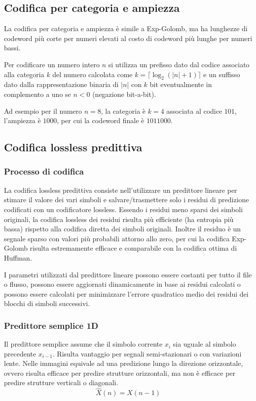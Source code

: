 \subsection{Codifica per categoria e ampiezza}
La codifica per categoria e ampiezza è simile a Exp-Golomb, ma ha lunghezze di codeword più corte per numeri elevati al
costo di codeword più lunghe per numeri bassi.

Per codificare un numero intero \(n\) si utilizza un prefisso dato dal codice associato alla categoria \(k\) del numero
calcolata come \(k = \lceil \log_2 (|n|+1) \rceil\) e un suffisso dato dalla rappresentazione binaria di \(|n|\) con \(k\)
bit eventualmente in complemento a uno se \(n < 0\) (negazione bit-a-bit).

Ad esempio per il numero \(n = 8\), la categoria è \(k = 4\) associata al codice \(101\), l'ampiezza è \(1000\), per cui
la codeword finale è \(1011000\).

\newpage

\subsection{Codifica lossless predittiva}
\subsubsection*{Processo di codifica}
La codifica lossless predittiva consiste nell'utilizzare un predittore lineare per stimare il valore dei vari simboli
e salvare/trasmettere solo i residui di predizione codificati con un codificatore lossless. Essendo i residui meno
sparsi dei simboli originali, la codifica lossless dei residui risulta più efficiente (ha entropia più bassa) rispetto
alla codifica diretta dei simboli originali. Inoltre il residuo è un segnale sparso con valori più probabili attorno
allo zero, per cui la codifica Exp-Golomb risulta estremamente efficace e comparabile con la codifica ottima di Huffman.

I parametri utilizzati dal predittore lineare possono essere costanti per tutto il file o flusso, possono essere aggiornati
dinamicamente in base ai residui calcolati o possono essere calcolati per minimizzare l'errore quadratico medio dei residui
dei blocchi di simboli successivi.

\subsubsection*{Predittore semplice 1D}
Il predittore semplice assume che il simbolo corrente \(x_i\) sia uguale al simbolo precedente \(x_{i-1}\). Risulta
vantaggio per segnali semi-stazionari o con variazioni lente. Nelle immagini equivale ad una predizione lungo la direzione
orizzontale, ovvero risulta efficace per predire strutture orizzontali, ma non è efficace per predire strutture verticali
o diagonali.
\[\hat{X}(n) = X(n-1)\]

